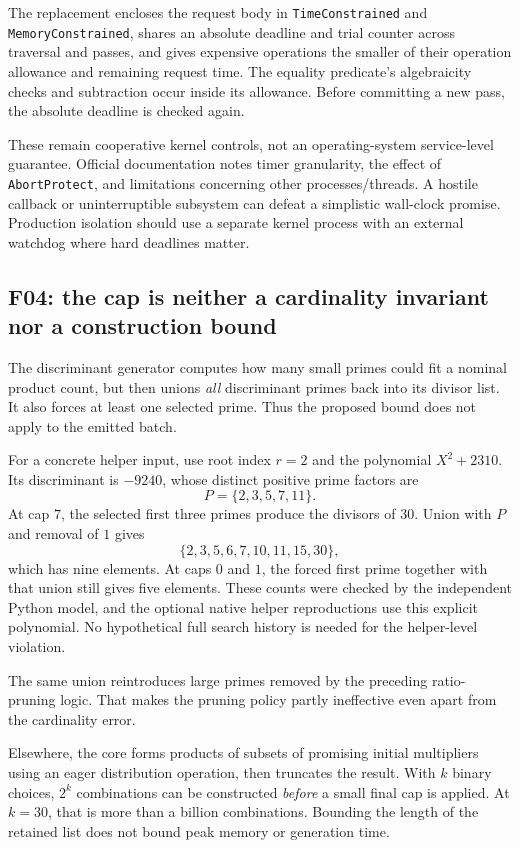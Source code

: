 \documentclass[11pt,letterpaper]{article}
\newcommand{\code}[1]{\texttt{#1}}
\theoremstyle{definition}
\begin{document}
The replacement encloses the request body in \code{TimeConstrained} and \code{MemoryConstrained}, shares an absolute deadline and trial counter across traversal and passes, and gives expensive operations the smaller of their operation allowance and remaining request time. The equality predicate's algebraicity checks and subtraction occur inside its allowance. Before committing a new pass, the absolute deadline is checked again.

These remain cooperative kernel controls, not an operating-system service-level guarantee. Official documentation notes timer granularity, the effect of \code{AbortProtect}, and limitations concerning other processes/threads. A hostile callback or uninterruptible subsystem can defeat a simplistic wall-clock promise. Production isolation should use a separate kernel process with an external watchdog where hard deadlines matter.\cite{timeconstrained,memoryconstrained}

\subsection{F04: the cap is neither a cardinality invariant nor a construction bound}

The discriminant generator computes how many small primes could fit a nominal product count, but then unions \emph{all} discriminant primes back into its divisor list. It also forces at least one selected prime. Thus the proposed bound does not apply to the emitted batch.

For a concrete helper input, use root index $r=2$ and the polynomial $X^2+2310$. Its discriminant is $-9240$, whose distinct positive prime factors are
\[
 P=\{2,3,5,7,11\}.
\]
At cap $7$, the selected first three primes produce the divisors of $30$. Union with $P$ and removal of $1$ gives
\[
 \{2,3,5,6,7,10,11,15,30\},
\]
which has nine elements. At caps $0$ and $1$, the forced first prime together with that union still gives five elements. These counts were checked by the independent Python model, and the optional native helper reproductions use this explicit polynomial. No hypothetical full search history is needed for the helper-level violation.

The same union reintroduces large primes removed by the preceding ratio-pruning logic. That makes the pruning policy partly ineffective even apart from the cardinality error.

Elsewhere, the core forms products of subsets of promising initial multipliers using an eager distribution operation, then truncates the result. With $k$ binary choices, $2^k$ combinations can be constructed \emph{before} a small final cap is applied. At $k=30$, that is more than a billion combinations. Bounding the length of the retained list does not bound peak memory or generation time.
\end{document}
